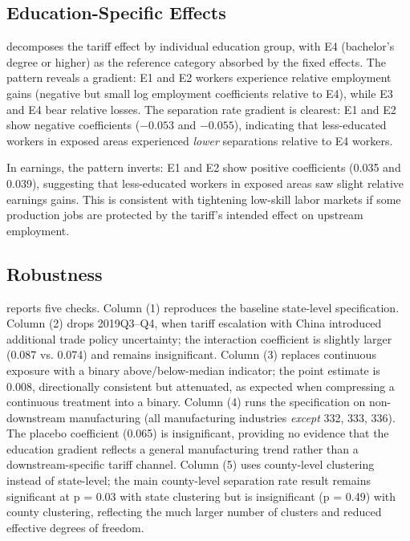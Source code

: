 \documentclass[12pt]{article}
\begin{document}


\subsection{Education-Specific Effects}

 decomposes the tariff effect by individual education group, with E4 (bachelor's degree or higher) as the reference category absorbed by the fixed effects. The pattern reveals a gradient: E1 and E2 workers experience relative employment gains (negative but small log employment coefficients relative to E4), while E3 and E4 bear relative losses. The separation rate gradient is clearest: E1 and E2 show negative coefficients ($-0.053$ and $-0.055$), indicating that less-educated workers in exposed areas experienced \emph{lower} separations relative to E4 workers.

In earnings, the pattern inverts: E1 and E2 show positive coefficients (0.035 and 0.039), suggesting that less-educated workers in exposed areas saw slight relative earnings gains. This is consistent with tightening low-skill labor markets if some production jobs are protected by the tariff's intended effect on upstream employment.



\subsection{Robustness}

 reports five checks. Column (1) reproduces the baseline state-level specification. Column (2) drops 2019Q3--Q4, when tariff escalation with China introduced additional trade policy uncertainty; the interaction coefficient is slightly larger (0.087 vs. 0.074) and remains insignificant. Column (3) replaces continuous exposure with a binary above/below-median indicator; the point estimate is 0.008, directionally consistent but attenuated, as expected when compressing a continuous treatment into a binary. Column (4) runs the specification on non-downstream manufacturing (all manufacturing industries \emph{except} 332, 333, 336). The placebo coefficient (0.065) is insignificant, providing no evidence that the education gradient reflects a general manufacturing trend rather than a downstream-specific tariff channel. Column (5) uses county-level clustering instead of state-level; the main county-level separation rate result remains significant at p = 0.03 with state clustering but is insignificant (p = 0.49) with county clustering, reflecting the much larger number of clusters and reduced effective degrees of freedom.
\end{document}
